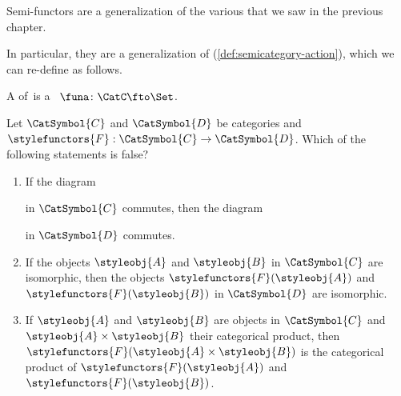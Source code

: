Semi-functors are a generalization of the various  that we saw in the previous chapter.


In particular, they are a generalization of  (\cref{def:semicategory-action}), which we can re-define as follows.

\begin{ctdefinition}\label{def:semicat-action-redefined}
    A  of~\CatC is a ~$\funa\colon \CatC \fto \Set$.
\end{ctdefinition}

\begin{quiz}
Let $\CatSymbol{C}$ and $\CatSymbol{D}$ be categories and $\stylefunctors{F}:\CatSymbol{C}\to\CatSymbol{D}$. Which of the following statements is false?
\begin{enumerate}[label=(\alph*)]
\item If the diagram 
in $\CatSymbol{C}$ commutes, then the diagram 
in $\CatSymbol{D}$ commutes.
\item If the objects $\styleobj{A}$ and $\styleobj{B}$ in $\CatSymbol{C}$ are isomorphic, then the objects $\stylefunctors{F}(\styleobj{A})$ and $\stylefunctors{F}(\styleobj{B})$ in $\CatSymbol{D}$ are isomorphic.
\item If $\styleobj{A}$ and $\styleobj{B}$ are objects in $\CatSymbol{C}$ and $\styleobj{A}\times\styleobj{B}$ their categorical product, then $\stylefunctors{F}(\styleobj{A}\times\styleobj{B})$ is the categorical product of $\stylefunctors{F}(\styleobj{A})$ and $\stylefunctors{F}(\styleobj{B})$.
\end{enumerate}
\end{quiz}

